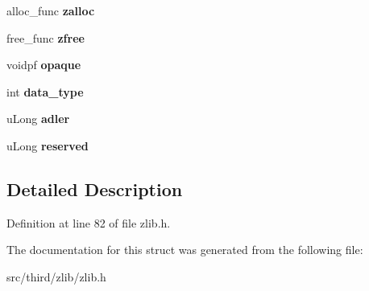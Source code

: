 \begin{DoxyCompactItemize}
\item 
\hypertarget{structz__stream_a39c3f1f00aaace5bf803e1c80643113b}{alloc\-\_\-func {\bfseries zalloc}}\label{d2/d34/structz__stream_a39c3f1f00aaace5bf803e1c80643113b}

\item 
\hypertarget{structz__stream_ab96ddcd732e86c059414c3f2927cad65}{free\-\_\-func {\bfseries zfree}}\label{d2/d34/structz__stream_ab96ddcd732e86c059414c3f2927cad65}

\item 
\hypertarget{structz__stream_aa3bd7fad5556e34ae1626d8ffd89acde}{voidpf {\bfseries opaque}}\label{d2/d34/structz__stream_aa3bd7fad5556e34ae1626d8ffd89acde}

\item 
\hypertarget{structz__stream_a66ea7939b3719b8c1e4a8aa6ca80316a}{int {\bfseries data\-\_\-type}}\label{d2/d34/structz__stream_a66ea7939b3719b8c1e4a8aa6ca80316a}

\item 
\hypertarget{structz__stream_a04334dfae29f0790d16d50052614e87f}{u\-Long {\bfseries adler}}\label{d2/d34/structz__stream_a04334dfae29f0790d16d50052614e87f}

\item 
\hypertarget{structz__stream_a9aa801f395596bdc62381d08fb96f648}{u\-Long {\bfseries reserved}}\label{d2/d34/structz__stream_a9aa801f395596bdc62381d08fb96f648}

\end{DoxyCompactItemize}


\subsection{Detailed Description}


Definition at line 82 of file zlib.\-h.



The documentation for this struct was generated from the following file\-:\begin{DoxyCompactItemize}
\item 
src/third/zlib/zlib.\-h\end{DoxyCompactItemize}
